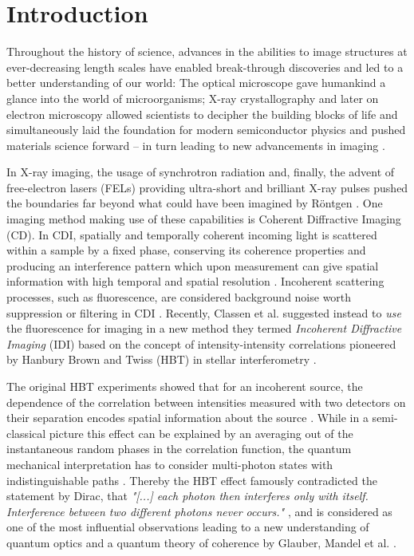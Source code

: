 \chapter{Introduction}
Throughout the history of science, advances in the abilities to image structures at ever-decreasing length scales have enabled break-through discoveries and led to a better understanding of our world:
The optical microscope gave humankind a glance into the world of microorganisms; X-ray crystallography and later on electron microscopy allowed scientists to decipher the building blocks of life and simultaneously laid the foundation for modern semiconductor physics and pushed materials science forward
 -- in turn leading to new advancements in imaging  \cite{hooke1665,laue1915,ruska1939,watson1953,hovmoeller1984}. 

In X-ray imaging, the usage of synchrotron radiation and, finally, the advent of free-electron lasers (FELs) providing ultra-short and brilliant X-ray pulses pushed the boundaries far beyond what could have been imagined by Röntgen \cite{cloetens1996,emma2010}. One imaging method making use of these capabilities is Coherent Diffractive Imaging (CD). In CDI, spatially and temporally coherent incoming light is scattered within a sample by a fixed phase, conserving its coherence properties and producing an interference pattern which upon measurement can give spatial information with high temporal and spatial resolution \cite{seibert2011,bostedt2010,barke2015}. Incoherent scattering processes, such as fluorescence, are considered background noise worth suppression or filtering in CDI \cite{schultz2013chapter7}.  Recently, Classen et al. suggested instead to \textit{use} the fluorescence for imaging in a new method they termed \textit{Incoherent Diffractive Imaging} (IDI) based on the concept of intensity-intensity correlations pioneered by Hanbury Brown and Twiss (HBT) in stellar interferometry \cite{classen2017,hanbury1956}. 

The original  HBT experiments showed that for an incoherent source, the dependence of the correlation between intensities measured with two detectors on their separation encodes spatial information about the source \cite{baym1997}. While in a semi-classical picture this effect can be explained by an averaging out of the instantaneous random phases in the correlation function, the quantum mechanical interpretation has to consider multi-photon states with indistinguishable paths \cite{fano1961,glauber2006}. Thereby the HBT effect famously contradicted the statement by Dirac, that \textit{"[...] each photon then interferes only with itself. Interference between two different photons never occurs."} \cite{dirac1958}, and is considered as one of the most influential observations leading to a new understanding of quantum optics and a quantum theory of coherence by Glauber, Mandel et al. \cite{glauber1963,mandel1959, hong1987}.

